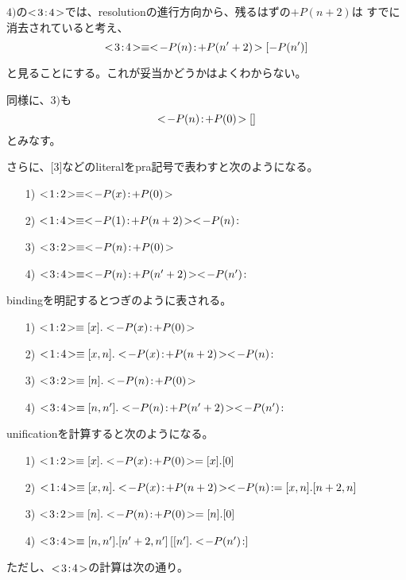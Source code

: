 \documentclass[10pt, onecolumn]{jarticle}   	%
\begin{document}
$4)$の$<\!3\!:\!4\!>$では、resolutionの進行方向から、残るはずの$+P(n+2)$は
すでに消去されていると考え、
$$\unify{3}{4} \equiv \unify{-P(n)}{+P(n'+2)}[-P(n')]$$

と見ることにする。これが妥当かどうかはよくわからない。

同様に、$3)$も
$$ <\!-P(n)\!:\!+P(0)\!>[]$$
とみなす。

さらに、[3]などのliteralをpra記号で表わすと次のようになる。

\begin{itemize}
\item[1)] $\unify{1}{2} \equiv \unify{-P(x)}{+P(0)}$
\item[2)] $\unify{1}{4} \equiv \unify{-P(1)}{+P(n+2)}\pra{-P(n)}$
\item[3)] $\unify{3}{2} \equiv \unify{-P(n)}{+P(0)}$
\item[4)] $\unify{3}{4} \equiv \unify{-P(n)}{+P(n'+2)}\pra{-P(n')}$
\end{itemize}

bindingを明記するとつぎのように表される。

\begin{itemize}
\item[1)] $\unify{1}{2} \equiv \binding{x}.\unify{-P(x)}{+P(0)}$
\item[2)] $\unify{1}{4} \equiv \binding{x,n}.\unify{-P(x)}{+P(n+2)}\pra{-P(n)}$
\item[3)] $\unify{3}{2} \equiv \binding{n}.\unify{-P(n)}{+P(0)}$
\item[4)] $\unify{3}{4} \equiv \binding{n,n'}.\unify{-P(n)}{+P(n'+2)}\pra{-P(n')}$
\end{itemize}

unificationを計算すると次のようになる。

\begin{itemize}
\item[1)] $\unify{1}{2} \equiv \binding{x}.\unify{-P(x)}{+P(0)} = \binding{x}.\tuple{0} $
\item[2)] $\unify{1}{4} \equiv \binding{x,n}.\unify{-P(x)}{+P(n+2)}\pra{-P(n)} =\\
 \binding{x,n}.\tuple{n+2,n}$
\item[3)] $\unify{3}{2} \equiv \binding{n}.\unify{-P(n)}{+P(0)} = \binding{n}.\tuple{0}$
\item[4)] $<\!3\!:\!4\!> \equiv [n,n'].[n'+2,n']\, [[n'].<\!-P(n')\!:]$
\end{itemize}
  
ただし、$<\!3\!:\!4\!>$の計算は次の通り。
\end{document}
